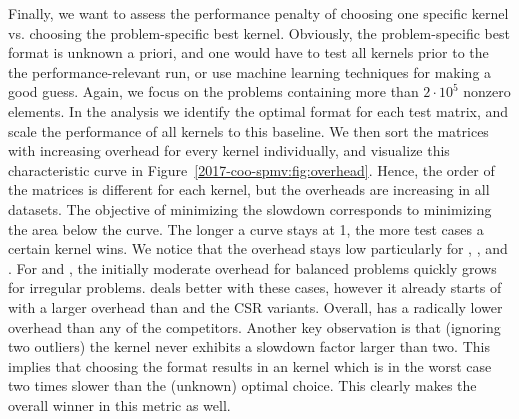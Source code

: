 Finally, we want to assess the performance penalty of choosing one specific kernel
vs. choosing the problem-specific best kernel.
Obviously, the problem-specific best format is unknown a priori, and one would have 
to test all kernels prior to the the performance-relevant run, or use machine learning techniques
for making a good guess. 
Again, we focus on the problems containing more than $2\cdot 10^5$ nonzero elements.
In the analysis we identify the optimal format for each test matrix,
and scale the performance of all kernels to this baseline.
We then sort the matrices with increasing overhead for every kernel
individually, and visualize this characteristic curve in
Figure~\ref{2017-coo-spmv:fig:overhead}. 
Hence, the order of the matrices is different for each kernel,
but the overheads are increasing in all datasets.
The objective of minimizing the slowdown corresponds to minimizing the area
below the curve. The longer a curve stays at 1, the more test cases a certain
kernel wins.
We notice that the overhead stays low particularly for \coo, \csri, and \csrfive.
For \sellp and \csr, the initially moderate overhead for balanced problems 
quickly grows for irregular problems.
\hyb deals better with these cases, however it already starts of with a larger overhead than 
\coo and the CSR variants.
Overall, \coo has a radically lower overhead than any of the competitors.
Another key observation is that (ignoring two outliers) the \coo kernel never
exhibits a slowdown factor larger than two. This implies that choosing the \coo
format results in an \spmv kernel which is in the worst case two times slower
than the (unknown) optimal choice. 
This clearly makes \coo the overall winner in this metric as well.
